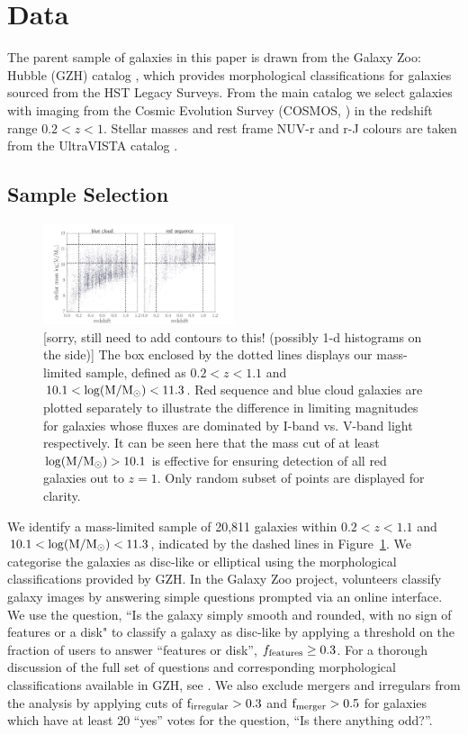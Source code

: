 \documentclass[useAMS,usenatbib]{mn2e}
\begin{document}
\section{Data}
\label{sec:Data}

The parent sample of galaxies in this paper is drawn from the Galaxy Zoo: Hubble (GZH) catalog \citep{Willett2016}, which provides morphological classifications for galaxies sourced from the HST Legacy Surveys. From the main catalog we select galaxies with imaging from the Cosmic Evolution Survey (COSMOS, \citet{Scoville2007}) in the redshift range $0.2<z<1$. Stellar masses and rest frame NUV-r and r-J colours are taken from the UltraVISTA catalog \citep{McCracken2012,Ilbert2013}.

\subsection{Sample Selection}
\label{sec:sampleselection}

\begin{figure}
\centering
\includegraphics[width=0.5\textwidth]{figures/mass_selection.pdf}
\caption{[sorry, still need to add contours to this! (possibly 1-d histograms on the side)] The box enclosed by the dotted lines displays our mass-limited sample, defined as $0.2<z<1.1$ and $10.1<\rm \log(M/M_{\odot})<11.3$. Red sequence and blue cloud galaxies are plotted separately to illustrate the difference in limiting magnitudes for galaxies whose fluxes are dominated by I-band vs. V-band light respectively. It can be seen here that the mass cut of at least $\rm \log(M/M_{\odot})>10.1$ is effective for ensuring detection of all red galaxies out to $z=1$. Only random subset of points are displayed for clarity.}
\label{masscut}
\end{figure}

We identify a mass-limited sample of 20,811 galaxies within $0.2<z<1.1$ and $10.1<\rm \log(M/M_{\odot})<11.3$, indicated by the dashed lines in Figure~\ref{masscut}. We categorise the galaxies as disc-like or elliptical using the morphological classifications provided by GZH. In the Galaxy Zoo project, volunteers classify galaxy images by answering simple questions prompted via an online interface. We use the question, ``Is the galaxy simply smooth and rounded, with no sign of features or a disk" to classify a galaxy as disc-like by applying a threshold on the fraction of users to answer ``features or disk'', $f_{\rm features}\ge0.3$. For a thorough discussion of the full set of questions and corresponding morphological classifications available in GZH, see \citet{Willett2016}. We also exclude mergers and irregulars from the analysis by applying cuts of $\rm f_{irregular} > 0.3$ and $\rm f_{merger} > 0.5$ for galaxies which have at least 20 ``yes'' votes for the question, ``Is there anything odd?''. 
\end{document}
